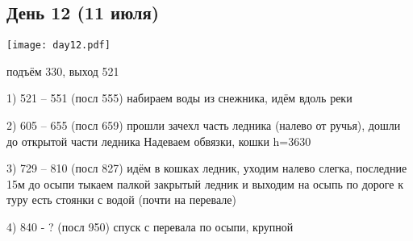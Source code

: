 \graphicspath{{Pictures/Chapter5/Day12}}


\subsection{День 12 (11 июля)}\label{subsec:Day12}
    \parbox[c]{\textwidth}{%
        \texttt{[image: day12.pdf]}\label{fig:Day12_map}%
    }
    \vspace{0.8cm}
подъём 330, выход 521

1) 521 -- 551 (посл 555) набираем воды из снежника, идём вдоль реки

2) 605 -- 655 (посл 659) прошли зачехл часть ледника (налево от ручья), дошли до открытой части ледника Надеваем обвязки, кошки h=3630

3) 729 -- 810 (посл 827) идём в кошках ледник, уходим налево слегка, последние 15м до осыпи тыкаем палкой закрытый ледник и выходим на осыпь
по дороге к туру есть стоянки с водой (почти на перевале)

4) 840 - ? (посл 950) спуск с перевала по осыпи, крупной

